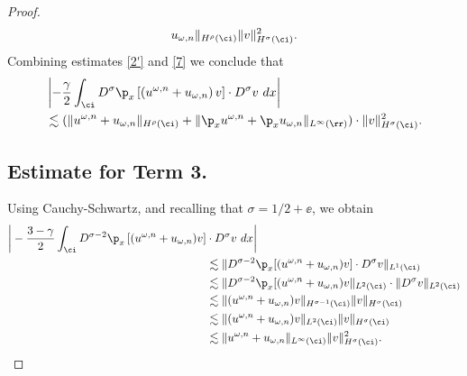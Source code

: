 \begin{proof}
\begin{equation}
\begin{split}
		u_{\omega,n}\|_{H^{\rho}(\ci)} \|v\|_{H^\sigma(\ci)}^2.
		\label{7}
	\end{split}
\end{equation}
Combining estimates \eqref{2'} and \eqref{7} we conclude that
\begin{equation}
	\begin{split}
		& \left | -\frac{\gamma}{2} \int_{\ci} D^\sigma \p_x \left[ \left( u^{\omega,n} + u_{\omega,n}
		\right)v \right]  \cdot D^\sigma v \ dx \right |
		\\
		& \lesssim (\|u^{\omega,n} + u_{\omega,n}\|_{H^{\rho}(\ci)} 
		 + \|\p_x u^{\omega,n} +
		\p_x u_{\omega,n}\|_{L^\infty(\rr)} ) \cdot \|v\|_{H^\sigma(\ci)}^2.
		\label{8}
	\end{split}
\end{equation}
%
\subsection{Estimate for Term 3.} Using Cauchy-Schwartz, and recalling that
$\sigma = 1/2 + \ee$,  we obtain
\begin{equation}
	\begin{split}
		\bigg | -\frac{3-\gamma}{2} \int_{\ci} D^{\sigma -2} \p_x \left[
		(u^{\omega,n} + u_{\omega,n})v \right]
		& \cdot D^\sigma v \ dx \bigg |
		\\
		& \lesssim
		\|D^{\sigma -2 } \p_x [(u^{\omega,n} + u_{\omega,n})v] \cdot D^\sigma v
		\|_{L^1(\ci)}
		\\
		& \lesssim \|D^{\sigma -2 } \p_x [(u^{\omega,n} +
		u_{\omega,n})v\|_{L^2(\ci)} \cdot \|D^\sigma v \|_{L^2(\ci)}
		\\
		& \lesssim \|(u^{\omega,n} + u_{\omega,n})v \|_{H^{\sigma -1 }(\ci)}
		\|v\|_{H^\sigma(\ci)}
		\\
		& \lesssim \|(u^{\omega,n} + u_{\omega,n})v \|_{L^2(\ci)} \|v\|_{H^\sigma(\ci)}
		\\
		& \lesssim \|u^{\omega,n} + u_{\omega,n} \|_{L^\infty(\ci)} \|v\|_{H^\sigma(\ci)}^2.
		\label{9}
	\end{split}
\end{equation}
%

\end{proof}
